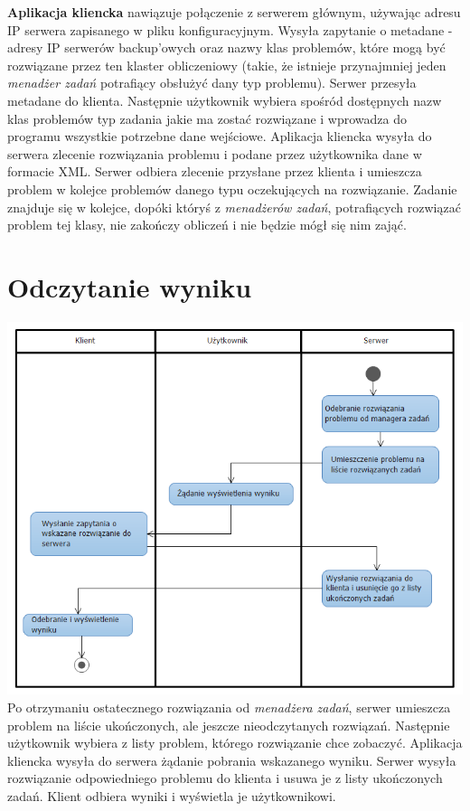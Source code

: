 \documentclass[12pt,a4paper,titlepage]{report}
\begin{document}
		\textbf{Aplikacja kliencka} nawiązuje połączenie z serwerem głównym, używając adresu IP serwera zapisanego w pliku konfiguracyjnym. Wysyła zapytanie o metadane - adresy IP serwerów backup'owych oraz nazwy klas problemów, które mogą być rozwiązane przez ten klaster obliczeniowy (takie, że istnieje przynajmniej jeden \textit{menadżer zadań} potrafiący obsłużyć dany typ problemu). Serwer przesyła metadane do klienta. Następnie użytkownik wybiera spośród dostępnych nazw klas problemów typ zadania jakie ma zostać rozwiązane i wprowadza do programu wszystkie potrzebne dane wejściowe. Aplikacja kliencka wysyła do serwera zlecenie rozwiązania problemu i podane przez użytkownika dane w formacie XML.
Serwer odbiera zlecenie przysłane przez klienta i umieszcza problem w kolejce problemów danego typu oczekujących na rozwiązanie. Zadanie znajduje się w kolejce, dopóki któryś z \textit{menadżerów zadań}, potrafiących rozwiązać problem tej klasy, nie zakończy obliczeń i nie będzie mógł się nim zająć.

		\section{Odczytanie wyniku}
		\includegraphics[width=\textwidth]{img/diagram2.png}
		Po otrzymaniu ostatecznego rozwiązania od \textit{menadżera zadań}, serwer umieszcza problem na liście ukończonych, ale jeszcze nieodczytanych rozwiązań. Następnie użytkownik wybiera z listy problem, którego rozwiązanie chce zobaczyć. Aplikacja kliencka wysyła do serwera żądanie pobrania wskazanego wyniku. Serwer wysyła rozwiązanie odpowiedniego problemu do klienta i usuwa je z listy ukończonych zadań. Klient odbiera wyniki i wyświetla je użytkownikowi.
		
\end{document}
